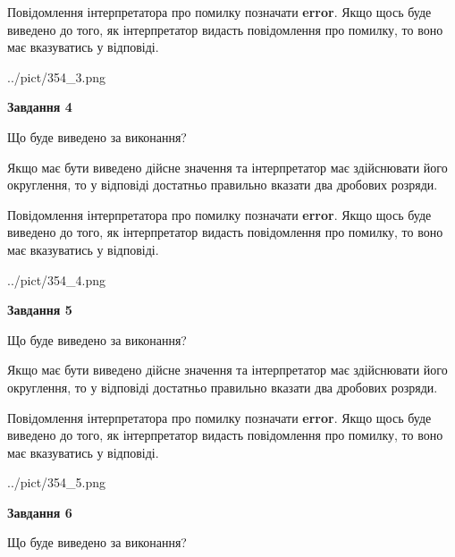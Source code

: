 \documentclass[12pt, ukrainian]{article}
\begin{document}
{\begin {Large}
Повідомлення інтерпретатора про помилку позначати \textbf{error}.
Якщо щось буде виведено до того, як інтерпретатор видасть повідомлення про помилку, 
то воно має вказуватись у відповіді. \par

\begin{center}
	{../pict/354_3.png}
\end{center}
\newpage

{\begin {center}\textbf{Завдання 4}\end {center}}\par
Що буде виведено за виконання? \par

Якщо має бути виведено дійсне значення та інтерпретатор має здійснювати його округлення, 
то у відповіді достатньо правильно вказати два дробових розряди.

Повідомлення інтерпретатора про помилку позначати \textbf{error}.
Якщо щось буде виведено до того, як інтерпретатор видасть повідомлення про помилку, 
то воно має вказуватись у відповіді. \par

\begin{center}
	{../pict/354_4.png}
\end{center}
\newpage

{\begin {center}\textbf{Завдання 5}\end {center}}\par
Що буде виведено за виконання? \par

Якщо має бути виведено дійсне значення та інтерпретатор має здійснювати його округлення, 
то у відповіді достатньо правильно вказати два дробових розряди.

Повідомлення інтерпретатора про помилку позначати \textbf{error}.
Якщо щось буде виведено до того, як інтерпретатор видасть повідомлення про помилку, 
то воно має вказуватись у відповіді. \par

\begin{center}
	{../pict/354_5.png}
\end{center}
\newpage

{\begin {center}\textbf{Завдання 6}\end {center}}\par
Що буде виведено за виконання? \par


\end{Large}}
\end{document}
